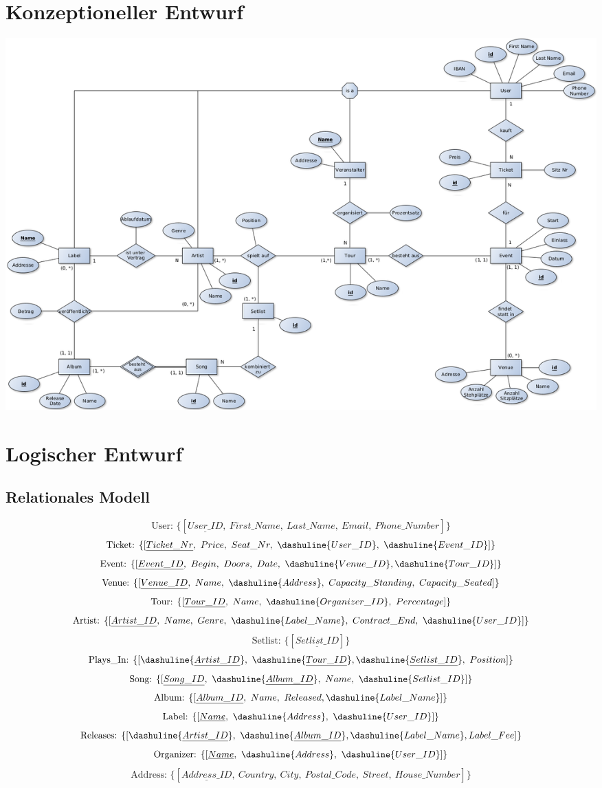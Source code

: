 \documentclass[12pt, oneside, a4paper]{article}
\newcommand{\set}[1]{\{#1\}} %
\newcommand{\relation}[2]{$$\text{{#1}: } \set{[{#2}]}$$}
\begin{document}
\section{Konzeptioneller Entwurf}
\vspace*{\fill}
\begin{adjustbox}{angle=90,center,caption=Entity Relationship Model,nofloat=figure}
	\includegraphics[width=1.4\textwidth]{img/erm_corrected_again.png}
	\label{fig:erm}
\end{adjustbox}





\newpage
\section{Logischer Entwurf}
\subsection{Relationales Modell}

\relation{User}{{\underline{User\_ID}},\ First\_Name,\ Last\_Name,\ Email,\ Phone\_Number}
\relation{Ticket}{\underline{Ticket\_Nr},\ Price,\ Seat\_Nr,\ \dashuline{User\_ID},\ \dashuline{Event\_ID}}
\relation{Event}{\underline{Event\_ID},\ Begin,\ Doors,\ Date,\ \dashuline{Venue\_ID}, \dashuline{Tour\_ID}}
\relation{Venue}{\underline{Venue\_ID},\ Name,\ \dashuline{Address},\ Capacity\_Standing,\ Capacity\_Seated}
\relation{Tour}{\underline{Tour\_ID},\ Name,\ \dashuline{Organizer\_ID},\ Percentage}
\relation{Artist}{\underline{Artist\_ID},\ Name,\ Genre,\ \dashuline{Label\_Name},\ Contract\_End,\ \dashuline{User\_ID}}
\relation{Setlist}{\underline{Setlist\_ID}}
\relation{Plays\_In}{\dashuline{\underline{Artist\_ID}},\ \dashuline{\underline{Tour\_ID}}, \dashuline{\underline{Setlist\_ID}},\ Position}
\relation{Song}{\underline{Song\_ID},\ \dashuline{\underline{Album\_ID}},\ Name,\ \dashuline{Setlist\_ID}}
\relation{Album}{\underline{Album\_ID},\ Name,\ Released, \dashuline{Label\_Name}}
\relation{Label}{\underline{Name},\ \dashuline{Address},\ \dashuline{User\_ID}}
\relation{Releases}{\dashuline{\underline{Artist\_ID}},\ \dashuline{\underline{Album\_ID}}, \dashuline{{Label\_Name}}, Label\_Fee}
\relation{Organizer}{\underline{Name},\ \dashuline{Address},\ \dashuline{User\_ID}}
\relation{Address}{\underline{Address\_ID},\ Country,\ City,\ Postal\_Code,\ Street,\ House\_Number}
\end{document}
